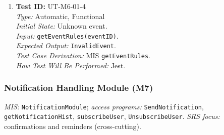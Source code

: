 \documentclass[12pt, titlepage]{article}
\begin{document}
\begin{enumerate}
    \item \textbf{Test ID:} UT-M6-01-4\\[0.25em]
    \textit{Type:} Automatic, Functional\\
    \textit{Initial State:} Unknown event.\\
    \textit{Input:} \texttt{getEventRules(eventID)}.\\
    \textit{Expected Output:} \texttt{InvalidEvent}.\\
    \textit{Test Case Derivation:} MIS \texttt{getEventRules}.\\
    \textit{How Test Will Be Performed:} Jest.
\end{enumerate}

\subsubsection{Notification Handling Module (M7)}

\textit{MIS:} \texttt{NotificationModule}; \textit{access programs:} \texttt{SendNotification}, \texttt{getNotificationHist}, \texttt{subscribeUser}, \texttt{UnsubscribeUser}. \textit{SRS focus:} confirmations and reminders (cross-cutting).
\end{document}
